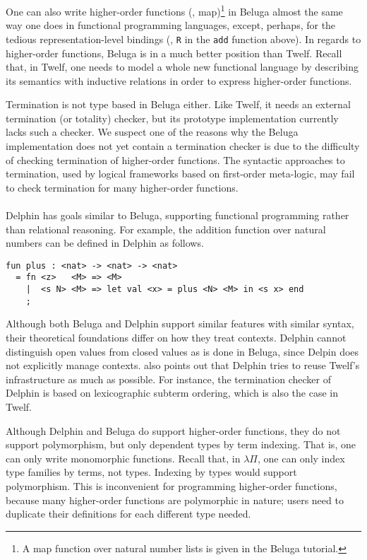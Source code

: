One can also write higher-order functions (\eg, map)\footnote{
        A map function over natural number lists is
        given in the Beluga tutorial. }
in Beluga almost the same way one does in functional programming languages,
except, perhaps, for the tedious representation-level bindings 
(\eg, \verb|R| in the \verb|add| function above).
In regards to higher-order functions, Beluga is in a much better position
than Twelf. Recall that, in Twelf, one needs to model a whole new
functional language by describing its semantics with inductive relations
in order to express higher-order functions.

Termination is not type based in Beluga either. Like Twelf, it needs
an external termination (or totality) checker, but its prototype
implementation currently lacks such a checker. We suspect one of the reasons
why the Beluga implementation does not yet contain a termination checker is
due to the difficulty of checking termination of higher-order functions.
The syntactic approaches to termination, used by logical frameworks
based on first-order meta-logic, may fail to check termination for
many higher-order functions.

\paragraph{}
Delphin \cite{pos08phd} has goals similar to Beluga,
supporting functional programming rather than relational reasoning.
For example, the addition function over natural numbers can be defined
in Delphin as follows.\vspace{-2em}
\begin{singlespace}
\begin{verbatim}
fun plus : <nat> -> <nat> -> <nat> 
  = fn <z>   <M> => <M>
    |  <s N> <M> => let val <x> = plus <N> <M> in <s x> end
    ;
\end{verbatim}
\end{singlespace}\noindent
Although both Beluga and Delphin support similar features with similar syntax,
their theoretical foundations differ \cite{Pie10} on how they treat contexts.
Delphin cannot distinguish open values from closed values as is done in Beluga,
since Delpin does not explicitly manage contexts.
\citet{Pie10} also points out that Delphin tries to reuse Twelf's infrastructure
as much as possible. For instance, the termination checker of Delphin is
based on lexicographic subterm ordering, which is also the case in Twelf.

Although Delphin and Beluga do support higher-order functions,
they do not support polymorphism, but only dependent types by term indexing.
That is, one can only write monomorphic functions. Recall that,
in $\lambda\Pi$, one can only index type families by terms, not types.
Indexing by types would support polymorphism.
This is inconvenient for programming higher-order functions,
because many higher-order functions are polymorphic in nature; users
need to duplicate their definitions for each different type needed.

